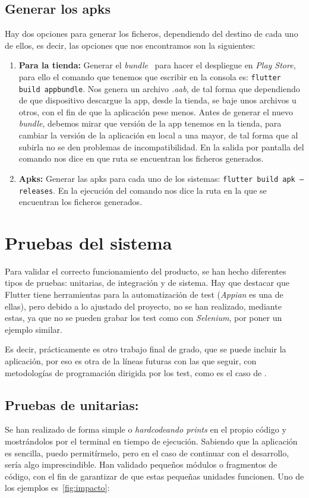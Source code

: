 \subsection{Generar los apks}
Hay dos opciones para generar los ficheros, dependiendo del destino de cada uno de ellos, es decir, las opciones que nos encontramos son la siguientes:
\begin{enumerate}
	\item \textbf{Para la tienda:} Generar el \emph{bundle}~\cite{wiki:bundle} para hacer el despliegue en \emph{Play Store}, para ello el comando que tenemos que escribir en la consola es: \texttt{flutter build appbundle}. Nos genera un archivo \emph{.aab}, de tal forma que dependiendo de que dispositivo descargue la app, desde la tienda, se baje unos archivos u otros, con el fin de que la aplicación pese menos.  Antes de generar el nuevo \emph{bundle}, debemos mirar que versión de la app tenemos en la tienda, para cambiar la versión de la aplicación en local a una mayor, de tal forma que al subirla no se den problemas de incompatibilidad. En la salida por pantalla del comando nos dice en que ruta se encuentran los ficheros generados.
	\item \textbf{Apks:} Generar las apks para cada uno de los sistemas: \texttt{flutter build apk --releases}. En la ejecución del comando nos dice la ruta en la que se encuentran los ficheros generados.
\end{enumerate} 

\section{Pruebas del sistema}
Para validar el correcto funcionamiento del producto, se han hecho diferentes tipos de pruebas: unitarias, de integración y de sistema. Hay que destacar que Flutter tiene herramientas para la automatización de test (\emph{Appian} es una de ellas), pero debido a lo ajustado del proyecto, no se han realizado, mediante estas, ya que no se pueden grabar los test como con \emph{Selenium}, por poner un ejemplo similar. 

Es decir, prácticamente es otro trabajo final de grado, que se puede incluir la aplicación, por eso es otra de la líneas futuras con las que seguir, con metodologías de programación dirigida por los test, como es el caso de .

\subsection{Pruebas de unitarias:}
Se han realizado de forma simple o \emph{hardcodeando prints} en el propio código y mostrándolos por el terminal en tiempo de ejecución. Sabiendo que la aplicación es sencilla, puedo permitírmelo, pero en el caso de continuar con el desarrollo, sería algo imprescindible. Han validado pequeños módulos o fragmentos de código, con el fin de garantizar de que estas pequeñas unidades funcionen. Uno de los ejemplos es~\ref{fig:impacto}:

